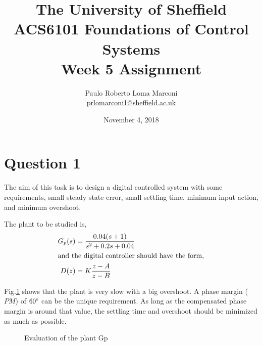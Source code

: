 \documentclass[11pt, a4paper]{article}
\title{The University of Sheffield\\
	ACS6101 Foundations of Control Systems\\ 
	Week 5 Assignment}
\author{Paulo Roberto Loma Marconi\\ \url{prlomarconi1@sheffield.ac.uk}}
\date{November 4, 2018}
\begin{document}
\maketitle

\section{Question 1}
The aim of this task is to design a digital controlled system with some requirements, small steady state error, small settling time, minimum input action, and minimum overshoot. 

The plant to be studied is,
\begin{align}
G_p(s) &= \dfrac{0.04(s+1)}{s^2+0.2s+0.04} \\
\intertext{and the digital controller should have the form,}
D(z) &= K\dfrac{z-A}{z-B}
\end{align}

Fig.\ref{fig:Q1_Gp} shows that the plant is very slow with a big overshoot. A phase margin ($PM$) of $60\degree$ can be the unique requirement. As long as the compensated phase margin is around that value, the settling time and overshoot should be minimized as much as possible.
 
\begin{figure}[H]
	\centering
	\caption{Evaluation of the plant Gp}
	\label{fig:Q1_Gp}
\end{figure}
\end{document}

